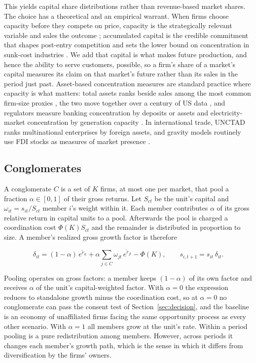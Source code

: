 \documentclass[12pt,a4paper]{article}
\begin{document}
This yields capital share distributions rather than revenue-based market shares. The choice has a theoretical and an empirical warrant. When firms choose capacity before they compete on price, capacity is the strategically relevant variable and sales the outcome \parencite{kreps1983quantity}; accumulated capital is the credible commitment that shapes post-entry competition \parencite{dixit1980role} and sets the lower bound on concentration in sunk-cost industries \parencite{sutton1991sunk}. We add that capital is what makes future production, and hence the ability to serve customers, possible, so a firm's share of a market's capital measures its claim on that market's future rather than its sales in the period just past. Asset-based concentration measures are standard practice where capacity is what matters: total assets ranks beside sales among the most common firm-size proxies \parencite{dang2018measuring}, the two move together over a century of US data \parencite{kwon2024100}, and regulators measure banking concentration by deposits or assets and electricity-market concentration by generation capacity \parencite{roach2002measuring}. In international trade, UNCTAD ranks multinational enterprises by foreign assets, and gravity models routinely use FDI stocks as measures of market presence \parencite{ramondo2013trade}.

\subsection{Conglomerates\label{sec:conglomerates}}

A conglomerate $C$ is a set of $K$ firms, at most one per market, that pool a fraction $\alpha \in [0, 1]$ of their gross returns. Let $S_{ct}$ be the unit's capital and $\omega_{it} = s_{it} / S_{ct}$ member $i$'s weight within it. Each member contributes $\alpha$ of its gross relative return in capital units to a pool. Afterwards the pool is charged a coordination cost $\Phi(K) S_{ct}$ and the remainder is distributed in proportion to size. A member's realized gross growth factor is therefore

$$\delta_{it} = (1-\alpha)\, e^{\tilde r_{it}} + \alpha \sum_{j \in C} \omega_{jt}\, e^{\tilde r_{jt}} - \Phi(K), \qquad s_{i,t+1} = s_{it}\,\delta_{it}.$$

Pooling operates on gross factors: a member keeps $(1 - \alpha)$ of its own factor and receives $\alpha$ of the unit's capital-weighted factor. With $\alpha = 0$ the expression reduces to standalone growth minus the coordination cost, so at $\alpha = 0$ no conglomerate can pass the consent test of Section~\ref{sec:decision}, and the baseline is an economy of unaffiliated firms facing the same opportunity process as every other scenario. With $\alpha = 1$ all members grow at the unit's rate. Within a period pooling is a pure redistribution among members. However, across periods it changes each member's growth path, which is the sense in which it differs from diversification by the firms' owners.
\end{document}
